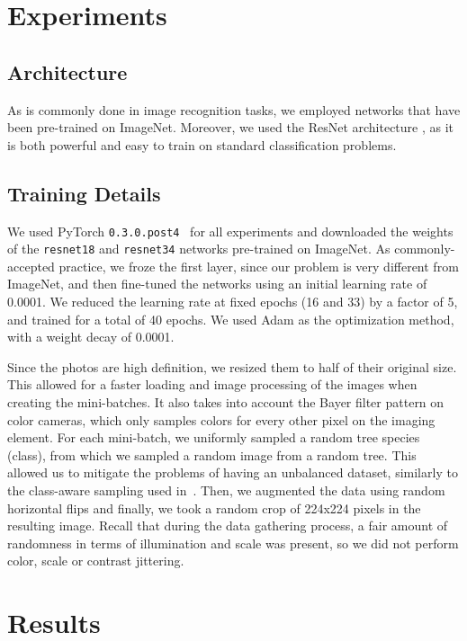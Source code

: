 \documentclass[letterpaper, 10 pt, conference]{ieeeconf}  %
\begin{document}
\section{Experiments} \label{sec:experiments}

\subsection{Architecture}
As is commonly done in image recognition tasks, we employed networks that have been pre-trained on ImageNet. Moreover, we used the ResNet architecture \cite{He2015}, as it is both powerful and easy to train on standard classification problems.

\subsection{Training Details}
We used PyTorch \texttt{0.3.0.post4}~\cite{pytorch} for all experiments and downloaded the weights of the \texttt{resnet18} and \texttt{resnet34} networks pre-trained on ImageNet. As commonly-accepted practice, we froze the first layer, since our problem is very different from ImageNet, and then fine-tuned the networks using an initial learning rate of 0.0001. We reduced the learning rate at fixed epochs (16 and 33) by a factor of 5, and trained for a total of 40 epochs. We used Adam as the optimization method, with a weight decay of 0.0001.

Since the photos are high definition, we resized them to half of their original size. This allowed for a faster loading and image processing of the images when creating the mini-batches. It also takes into account the Bayer filter pattern on color cameras, which only samples colors for every other pixel on the imaging element. For each mini-batch, we uniformly sampled a random tree species (class), from which we sampled a random image from a random tree. This allowed us to mitigate the problems of having an unbalanced dataset, similarly to the class-aware sampling used in~\cite{RelayBackpropECCV2016}. Then, we augmented the data using random horizontal flips and finally, we took a random crop of 224x224 pixels in the resulting image. Recall that during the data gathering process, a fair amount of randomness in terms of illumination and scale was present, so we did not perform color, scale or contrast jittering.

\section{Results} \label{sec:results}
\end{document}
